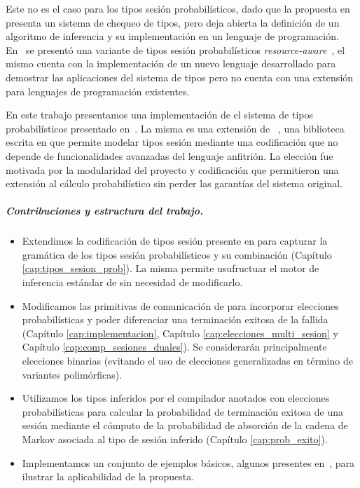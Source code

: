 Este no es el caso para los tipos sesión probabilísticos, dado que la
propuesta en~\cite{DBLP:conf/concur/InversoMPTT20} presenta un sistema de
chequeo de tipos, pero deja abierta la definición de un algoritmo de inferencia
y su implementación en un lenguaje de programación. En~\cite{DasDH20} se
presentó una variante de tipos sesión probabilísticos
\emph{resource-aware}~\cite{DasHP18}, el mismo cuenta con la implementación de
un nuevo lenguaje desarrollado para demostrar las aplicaciones del sistema de
tipos pero no cuenta con una extensión para lenguajes de programación
existentes.

En este trabajo presentamos una implementación de el sistema de tipos
probabilísticos presentado en~\cite{DBLP:conf/concur/InversoMPTT20}. La misma
es una extensión de \FuSe~\cite{DBLP:journals/jfp/Padovani17}, una biblioteca
escrita en \OCaml que permite modelar tipos sesión mediante una codificación
que no depende de funcionalidades avanzadas del lenguaje anfitrión. La elección
fue motivada por la modularidad del proyecto y codificación que permitieron
una extensión al cálculo probabilístico sin perder las garantías del sistema
original.

\subparagraph*{Contribuciones y estructura del trabajo.}
\begin{itemize}

	\item Extendimos la codificación de tipos sesión presente en \FuSe para
		capturar la gramática de los tipos sesión probabilísticos y su
		combinación (Capítulo \ref{cap:tipos_sesion_prob}). La misma
		permite usufructuar el motor de inferencia estándar de \OCaml
		sin necesidad de modificarlo.

	\item Modificamos las primitivas de comunicación de \FuSe para
		incorporar elecciones probabilísticas y poder diferenciar una
		terminación exitosa de la fallida (Capítulo
		\ref{cap:implementacion}, Capítulo
		\ref{cap:elecciones_multi_sesion} y Capítulo
		\ref{cap:comp_sesiones_duales}). Se considerarán principalmente
		elecciones binarias (evitando el uso de elecciones
		generalizadas en término de variantes polimórficas).

	\item Utilizamos los tipos inferidos por el compilador anotados con
		elecciones probabilísticas para calcular la probabilidad de
		terminación exitosa de una sesión mediante el cómputo de la
		probabilidad de absorción de la cadena de Markov asociada al
		tipo de sesión inferido (Capítulo \ref{cap:prob_exito}).

	\item Implementamos un conjunto de ejemplos básicos, algunos presentes
		en~\cite{DBLP:conf/concur/InversoMPTT20}, para ilustrar la
		aplicabilidad de la propuesta.
\end{itemize}
